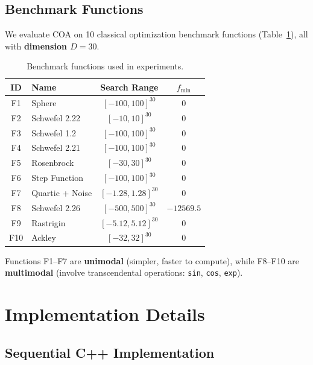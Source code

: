 \documentclass[12pt, a4paper]{article}
\begin{document}
\subsection{Benchmark Functions}

We evaluate COA on 10 classical optimization benchmark functions (Table~\ref{tab:benchmarks}), all with \textbf{dimension $D = 30$}.

\begin{table}[H]
\centering
\caption{Benchmark functions used in experiments.}
\label{tab:benchmarks}
\begin{tabular}{@{}clcc@{}}
\toprule
\textbf{ID} & \textbf{Name} & \textbf{Search Range} & \textbf{$f_{\min}$} \\
\midrule
F1  & Sphere          & $[-100, 100]^{30}$   & 0 \\
F2  & Schwefel 2.22   & $[-10, 10]^{30}$     & 0 \\
F3  & Schwefel 1.2    & $[-100, 100]^{30}$   & 0 \\
F4  & Schwefel 2.21   & $[-100, 100]^{30}$   & 0 \\
F5  & Rosenbrock      & $[-30, 30]^{30}$     & 0 \\
F6  & Step Function   & $[-100, 100]^{30}$   & 0 \\
F7  & Quartic + Noise & $[-1.28, 1.28]^{30}$ & 0 \\
F8  & Schwefel 2.26   & $[-500, 500]^{30}$   & $-12569.5$ \\
F9  & Rastrigin       & $[-5.12, 5.12]^{30}$ & 0 \\
F10 & Ackley          & $[-32, 32]^{30}$     & 0 \\
\bottomrule
\end{tabular}
\end{table}

Functions F1--F7 are \textbf{unimodal} (simpler, faster to compute), while F8--F10 are \textbf{multimodal} (involve transcendental operations: \texttt{sin}, \texttt{cos}, \texttt{exp}).

\section{Implementation Details}

\subsection{Sequential C++ Implementation}
\end{document}
